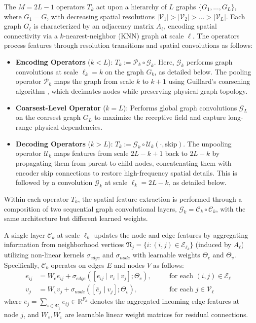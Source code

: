 \documentclass[a4paper,11pt]{article}
\theoremstyle{definition}
\theoremstyle{plain}
\theoremstyle{remark}
\begin{document}
The $M = 2L-1$ operators $T_k$ act upon a hierarchy of $L$ graphs $\{G_1, \dots, G_L\}$, where $G_1=G$,  with decreasing spatial resolutions $|\mathcal{V}_1| > |\mathcal{V}_2| > \dots > |\mathcal{V}_L|$. Each graph $G_\ell$ is characterized by an adjacency matrix $A_\ell$, encoding spatial connectivity via a $k$-nearest-neighbor (KNN) graph at scale $\ell$. The operators process features through resolution transitions and spatial convolutions as follows:
\begin{itemize}
    \item \textbf{Encoding Operators} ($k < L$): $T_k := \mathcal{P}_k \circ \mathcal{G}_k$. Here, $\mathcal{G}_k$ performs graph convolutions at scale $\ell_k=k$ on the graph $G_k$, as detailed below. The pooling operator $\mathcal{P}_k$ maps the graph from scale $k$ to $k+1$ using Guillard’s coarsening algorithm \cite{guillard:inria-00074773}, which decimates nodes while preserving physical graph topology.
    \item \textbf{Coarsest-Level Operator} ($k = L$): Performs global graph convolutions $\mathcal{G}_L$ on the coarsest graph $G_L$ to maximize the receptive field and capture long-range physical dependencies.
    \item \textbf{Decoding Operators} ($k > L$): $T_k := \mathcal{G}_k \circ \mathcal{U}_k (\cdot, \text{skip})$. The unpooling operator $\mathcal{U}_k$ maps features from scale $2L-k+1$ back to $2L-k$ by propagating them from parent to child nodes, concatenating them with encoder skip connections to restore high-frequency spatial details. This is followed by a  convolution $\mathcal{G}_k$ at scale $\ell_k=2L-k$, as detailed below.
\end{itemize}

Within each operator $T_k$, the spatial feature extraction is performed through a composition of two sequential graph convolutional layers, $\mathcal{G}_{k}= \mathcal{C}_{k} \circ \mathcal{C}_{k}$, with the same architecture but different learned weights. 

A single layer $\mathcal{C}_{k}$ at scale $\ell_k$ updates the node and edge features by aggregating information from neighborhood vertices $\mathfrak{N}_j=\{i:(i,j)\in \mathcal{E}_{\ell_k}\}$ (induced by $A_{\ell}$) utilizing non-linear kernels $\sigma_{edge}$ and $\sigma_{node}$ with learnable weights $\Theta_e$ and $\Theta_v$. Specifically, $\mathcal{C}_{k}$ operates on edges $E$ and nodes $V$ as follows:
\begin{align}
e_{ij} &= W_e e_{ij} + \sigma_{edge}([e_{ij} \mid v_i \mid v_j] ; \Theta_e), \quad &&\text{for each } (i,j) \in \mathcal{E}_{\ell} \label{eq:edge_update} \\
v_j &= W_v v_j + \sigma_{node}([\bar{e}_j \mid v_j] ; \Theta_v), \quad &&\text{for each } j \in \mathcal{V}_{\ell} \label{eq:node_update}
\end{align}
where $\bar e_j = \sum_{i \in \mathfrak{N}_j} e_{ij} \in \mathbb{R}^{F_h}$ denotes the aggregated incoming edge features at node $j$, and $W_e, W_v$ are learnable linear weight matrices for residual connections.
\end{document}
